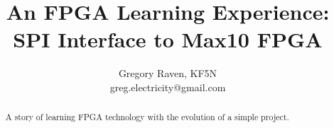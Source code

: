 \documentclass[letterpaper,12pt]{article}
\title{An FPGA Learning Experience:  SPI Interface to Max10 FPGA}
\author{Gregory Raven, KF5N \\ greg.electricity@gmail.com}
\begin{document}
	
		\maketitle
	
	\begin{abstract}
		A story of learning FPGA technology with the evolution of a simple project.
	\end{abstract}








\end{document}
